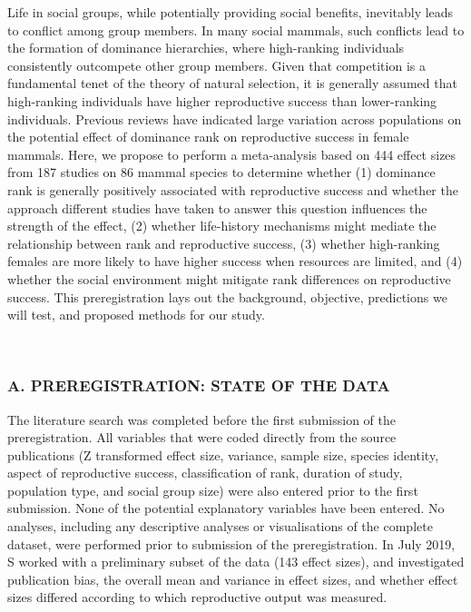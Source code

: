 \documentclass[]{article}
\begin{document}
Life in social groups, while potentially providing social benefits,
inevitably leads to conflict among group members. In many social
mammals, such conflicts lead to the formation of dominance hierarchies,
where high-ranking individuals consistently outcompete other group
members. Given that competition is a fundamental tenet of the theory of
natural selection, it is generally assumed that high-ranking individuals
have higher reproductive success than lower-ranking individuals.
Previous reviews have indicated large variation across populations on
the potential effect of dominance rank on reproductive success in female
mammals. Here, we propose to perform a meta-analysis based on 444 effect
sizes from 187 studies on 86 mammal species to determine whether (1)
dominance rank is generally positively associated with reproductive
success and whether the approach different studies have taken to answer
this question influences the strength of the effect, (2) whether
life-history mechanisms might mediate the relationship between rank and
reproductive success, (3) whether high-ranking females are more likely
to have higher success when resources are limited, and (4) whether the
social environment might mitigate rank differences on reproductive
success. This preregistration lays out the background, objective,
predictions we will test, and proposed methods for our study.

~

\hypertarget{a.-preregistration-state-of-the-data}{%
\subsubsection{A. PREREGISTRATION: STATE OF THE
DATA}\label{a.-preregistration-state-of-the-data}}

The literature search was completed before the first submission of the
preregistration. All variables that were coded directly from the source
publications (Z transformed effect size, variance, sample size, species
identity, aspect of reproductive success, classification of rank,
duration of study, population type, and social group size) were also
entered prior to the first submission. None of the potential explanatory
variables have been entered. No analyses, including any descriptive
analyses or visualisations of the complete dataset, were performed prior
to submission of the preregistration. In July 2019, S worked with a
preliminary subset of the data (143 effect sizes), and investigated
publication bias, the overall mean and variance in effect sizes, and
whether effect sizes differed according to which reproductive output was
measured.
\end{document}
